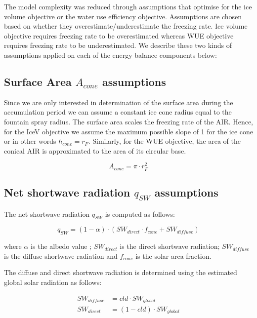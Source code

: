 \documentclass[tc, manuscript]{copernicus}
\begin{document}
The model complexity was reduced through assumptions that optimise for the ice volume objective or the water use
efficiency objective. Assumptions are chosen based on whether they overestimate/underestimate the freezing rate.
Ice volume objective requires freezing rate to be overestimated whereas WUE objective requires freezing rate to
be underestimated. We describe these two kinds of assumptions applied on each of the energy balance components
below: 

\subsection{Surface Area $A_{cone}$ assumptions}

Since we are only interested in determination of the surface area during the accumulation period we can assume a
constant ice cone radius equal to the fountain spray radius. The surface area scales the freezing rate of the
AIR. Hence, for the IceV objective we assume the maximum possible slope of 1 for the ice cone or in other words
$h_{cone} = r_{F}$. Similarly, for the WUE objective, the area of the conical AIR is
approximated to the area of its circular base. 

\begin{equation} A_{cone} =\pi \cdot r_{F}^2 \label{eq:Area} \end{equation}

\subsection{Net shortwave radiation \texorpdfstring{$q_{SW}$}{Lg} assumptions}
\label{sec:SW}

The net shortwave radiation $q_{SW}$ is computed as follows:

\begin{equation} q_{SW} = (1- \alpha) \cdot ( SW_{direct} \cdot f_{cone} + SW_{diffuse})
\label{eqn:SW} \end{equation}

where $\alpha$ is the albedo value ; $SW_{direct}$ is the direct shortwave radiation; $SW_{diffuse}$ is the
diffuse shortwave radiation and $f_{cone}$ is the solar area fraction.

The diffuse and direct shortwave radiation is determined using the estimated global solar radiation as follows:

\begin{equation}
\begin{split}
  SW_{diffuse} &= cld \cdot SW_{global}\\
  SW_{direct} &= (1-cld) \cdot SW_{global}
\end{split}
\end{equation}
\end{document}

